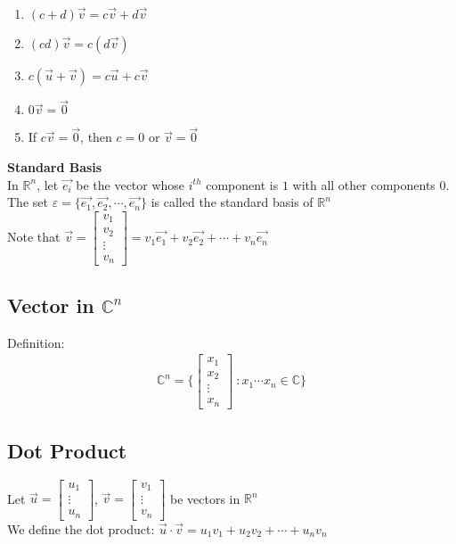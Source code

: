 \documentclass[12pt, letterpaper]{article}
\begin{document}
\begin{enumerate}
    \item $(c+d)\vec{v} = c\vec{v} + d\vec{v}$
    \item $(cd)\vec{v} = c(d\vec{v})$
    \item $c(\vec{u}+\vec{v}) = c\vec{u} + c\vec{v}$
    \item $0\vec{v} = \vec{0}$
    \item If $c\vec{v} = \vec{0}$, then $c=0$ or $\vec{v} = \vec{0}$
\end{enumerate}
\textbf{Standard Basis} \\
In $\mathbb{R}^n$, let $\vec{e_i}$ be the vector whose $i^{th}$ component is $1$ with all other components
0. The set $\varepsilon = \{\vec{e_1}, \vec{e_2}, \cdots, \vec{e_n}\}$ is called the standard basis of $\mathbb{R}^n$ \\
Note that $\vec{v} = \begin{bmatrix} v_1 \\ v_2 \\ \vdots \\ v_n \end{bmatrix} = v_1\vec{e_1} + v_2\vec{e_2} + \cdots + v_n\vec{e_n}$
\subsection{Vector in $\mathbb{C}^n$}
Definition: 
\begin{align*}
    \mathbb{C}^n = \{\begin{bmatrix} x_1 \\ x_2 \\ \vdots \\ x_n \end{bmatrix}\ : x_1 \cdots x_n \in\mathbb{C}\}
\end{align*}
\subsection{Dot Product}
Let $\vec{u} = \begin{bmatrix} u_1 \\ \vdots \\ u_n\end{bmatrix}$, $\vec{v} = \begin{bmatrix} v_1 \\ \vdots \\ v_n\end{bmatrix}$ be vectors in $\mathbb{R}^n$ \\
We define the dot product: $\vec{u} \cdot \vec{v} = u_1v_1 + u_2v_2 + \cdots + u_nv_n$
\end{document}
